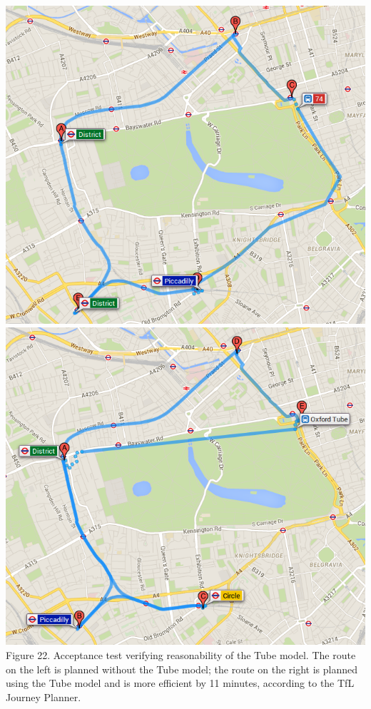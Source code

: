 \documentclass[a4paper, 10pt]{report}
\begin{document}
\begin{center}
\includegraphics[scale=0.3]{eval_notubemodel.png}
\includegraphics[scale=0.3]{eval_tubemodel_works.png} \\
Figure 22. Acceptance test verifying reasonability of the Tube model. The route on the left is planned without the Tube model; the route on the right is planned using the Tube model and is more efficient by 11 minutes, according to the TfL Journey Planner.
\end{center}
\end{document}
